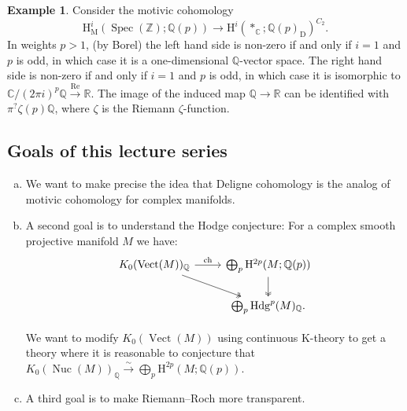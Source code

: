 \documentclass[draft]{amsart}
\newcommand{\ZZ}{\mathbb{Z}}
\newcommand{\QQ}{\mathbb{Q}}
\newcommand{\RR}{\mathbb{R}}
\newcommand{\CC}{\mathbb{C}}
\renewcommand{\H}{\mathrm{H}}
\newcommand{\D}{\mathrm{D}}
\newcommand{\isoto}{\mathbin{\xrightarrow{\sim}}}
\DeclareMathOperator{\Spec}{Spec}
\DeclareMathOperator{\Nuc}{Nuc}
\DeclareMathOperator{\Vect}{Vect}
\theoremstyle{definition}
\newtheorem{ex}[thm]{Example}
\begin{document}
\begin{ex}
Consider the motivic cohomology
\[
\H^i_{\mathrm{M}}(\Spec(\ZZ);\QQ(p)) \to \H^i(*_{\CC}; \QQ(p)_{\D})^{C_2}.
\]
In weights $p>1$, (by Borel) the left hand side is non-zero if and only if $i=1$ and $p$ is odd, in which case it is a one-dimensional $\QQ$-vector space. The right hand side is non-zero if and only if $i=1$ and $p$ is odd, in which case it is isomorphic to $\CC/(2\pi i)^p\QQ \xrightarrow{\mathrm{Re}} \RR$. The image of the induced map $\QQ \to \RR$ can be identified with $\pi^? \zeta(p)\QQ$, where $\zeta$ is the Riemann $\zeta$-function.
\end{ex}

\subsection{Goals of this lecture series} 
\begin{enumerate}[(a)]
\item We want to make precise the idea that Deligne cohomology is the analog of motivic cohomology for complex manifolds.

\item A second goal is to understand the Hodge conjecture: For a complex smooth projective manifold $M$ we have:
\[
\begin{tikzcd}
K_0(\Vect(M))_{\QQ} \ar[dr,twoheadrightarrow] \ar[r,"\mathrm{ch}"] & \bigoplus_p \H^{2p}(M; \QQ(p)) \ar[d,twoheadrightarrow] \\
& \bigoplus_p \mathrm{Hdg}^p(M)_{\QQ}.
\end{tikzcd}
\]

We want to modify $K_0(\Vect(M))$ using continuous K-theory to get a theory where it is reasonable to conjecture that $K_0(\Nuc(M))_\QQ \isoto \bigoplus_p \H^{2p}(M;\QQ(p))$.

\item A third goal is to make Riemann--Roch more transparent.
\end{enumerate}
\end{document}
